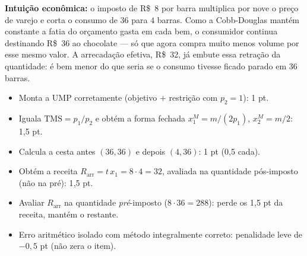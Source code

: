 \begin{solucao}
\textbf{Intuição econômica:} o imposto de R\$~8 por barra multiplica por nove o preço de varejo e corta o consumo de $36$ para $4$ barras. Como a Cobb-Douglas mantém constante a fatia do orçamento gasta em cada bem, o consumidor continua destinando R\$~36 ao chocolate --- só que agora compra muito menos volume por esse mesmo valor. A arrecadação efetiva, R\$~32, já embute essa retração da quantidade: é bem menor do que seria se o consumo tivesse ficado parado em $36$ barras.
\rubricalabel
\begin{itemize}
\item Monta a UMP corretamente (objetivo $+$ restrição com $p_2=1$): 1 pt.
\item Iguala $\text{TMS}=p_1/p_2$ e obtém a forma fechada $x_1^{M}=m/(2p_1)$, $x_2^{M}=m/2$: 1{,}5 pt.
\item Calcula a cesta antes $(36,36)$ e depois $(4,36)$: 1 pt (0{,}5 cada).
\item Obtém a receita $R_{\text{arr}}=t\,x_1=8\cdot 4=32$, avaliada na quantidade pós-imposto (não na pré): 1{,}5 pt.
\item Avaliar $R_{\text{arr}}$ na quantidade \emph{pré}-imposto ($8\cdot 36=288$): perde os 1{,}5 pt da receita, mantém o restante.
\item Erro aritmético isolado com método integralmente correto: penalidade leve de $-0{,}5$ pt (não zera o item).
\end{itemize}
\end{solucao}


